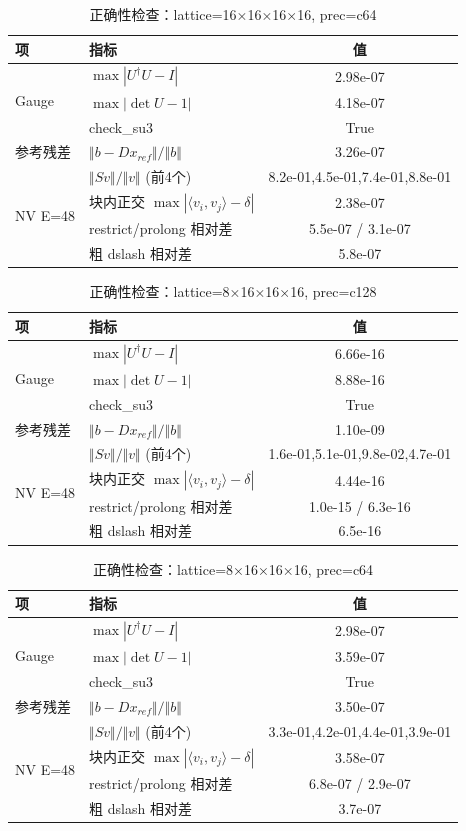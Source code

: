 \begin{table}[h]\centering
\begin{tabular}{llc}
\toprule
项 & 指标 & 值 \\
\midrule
\multirow{3}{*}{Gauge} & $\max|U^\dagger U-I|$ & 2.98e-07 \\
& $\max|\det U - 1|$ & 4.18e-07 \\
& check\_su3 & True \\
参考残差 & $\Vert b-D x_{ref}\Vert/\Vert b\Vert$ & 3.26e-07 \\
\multirow{4}{*}{NV E=48}
& $\Vert S v\Vert/\Vert v\Vert$ (前4个) & 8.2e-01,4.5e-01,7.4e-01,8.8e-01 \\
& 块内正交 $\max|\langle v_i,v_j\rangle-\delta|$ & 2.38e-07 \\
& restrict/prolong 相对差 & 5.5e-07 / 3.1e-07 \\
& 粗 dslash 相对差 & 5.8e-07 \\
\bottomrule
\end{tabular}
\caption{正确性检查：lattice=16×16×16×16, prec=c64}
\end{table}
\begin{table}[h]\centering
\begin{tabular}{llc}
\toprule
项 & 指标 & 值 \\
\midrule
\multirow{3}{*}{Gauge} & $\max|U^\dagger U-I|$ & 6.66e-16 \\
& $\max|\det U - 1|$ & 8.88e-16 \\
& check\_su3 & True \\
参考残差 & $\Vert b-D x_{ref}\Vert/\Vert b\Vert$ & 1.10e-09 \\
\multirow{4}{*}{NV E=48}
& $\Vert S v\Vert/\Vert v\Vert$ (前4个) & 1.6e-01,5.1e-01,9.8e-02,4.7e-01 \\
& 块内正交 $\max|\langle v_i,v_j\rangle-\delta|$ & 4.44e-16 \\
& restrict/prolong 相对差 & 1.0e-15 / 6.3e-16 \\
& 粗 dslash 相对差 & 6.5e-16 \\
\bottomrule
\end{tabular}
\caption{正确性检查：lattice=8×16×16×16, prec=c128}
\end{table}
\begin{table}[h]\centering
\begin{tabular}{llc}
\toprule
项 & 指标 & 值 \\
\midrule
\multirow{3}{*}{Gauge} & $\max|U^\dagger U-I|$ & 2.98e-07 \\
& $\max|\det U - 1|$ & 3.59e-07 \\
& check\_su3 & True \\
参考残差 & $\Vert b-D x_{ref}\Vert/\Vert b\Vert$ & 3.50e-07 \\
\multirow{4}{*}{NV E=48}
& $\Vert S v\Vert/\Vert v\Vert$ (前4个) & 3.3e-01,4.2e-01,4.4e-01,3.9e-01 \\
& 块内正交 $\max|\langle v_i,v_j\rangle-\delta|$ & 3.58e-07 \\
& restrict/prolong 相对差 & 6.8e-07 / 2.9e-07 \\
& 粗 dslash 相对差 & 3.7e-07 \\
\bottomrule
\end{tabular}
\caption{正确性检查：lattice=8×16×16×16, prec=c64}
\end{table}
